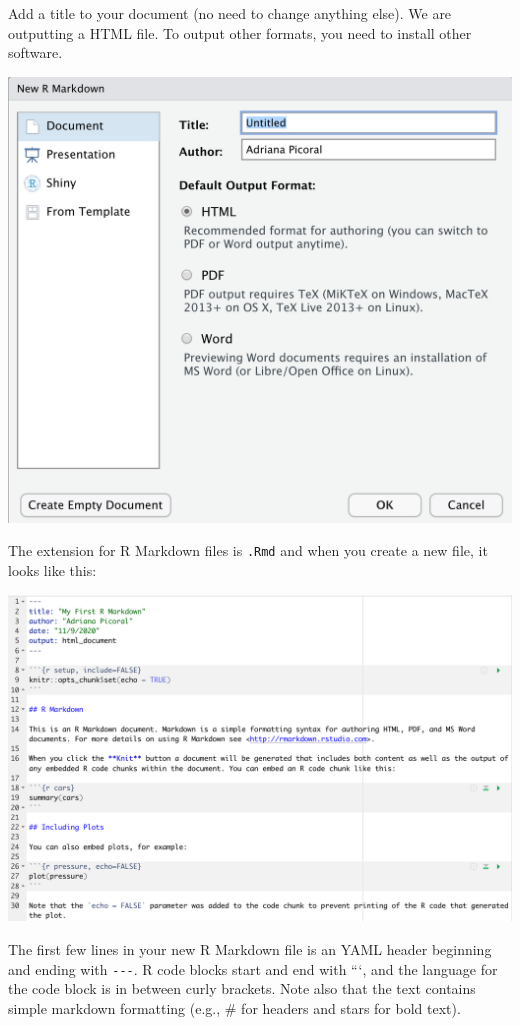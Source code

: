 \documentclass[
]{book}
\begin{document}
Add a title to your document (no need to change anything else). We are outputting a HTML file. To output other formats, you need to install other software.

\includegraphics[width=22.03in]{images/rmarkdown_popup_window}

The extension for R Markdown files is \texttt{.Rmd} and when you create a new file, it looks like this:

\includegraphics[width=30.22in]{images/new_rmarkdown_file}

The first few lines in your new R Markdown file is an YAML header beginning and ending with \texttt{-\/-\/-}. R code blocks start and end with ```, and the language for the code block is in between curly brackets. Note also that the text contains simple markdown formatting (e.g., \# for headers and stars for bold text).
\end{document}
